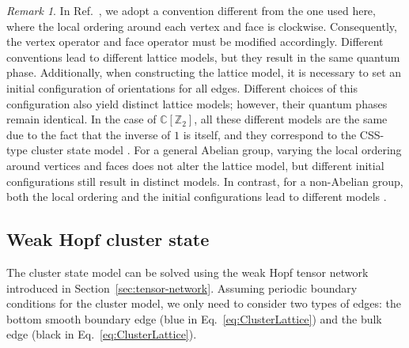 \documentclass[a4paper,11pt]{article}
\theoremstyle{theorem}
\theoremstyle{remark}
\newtheorem{remark}{Remark}[section]
\begin{document}
\begin{remark}
In Ref.~\cite{jia2024generalized}, we adopt a convention different from the one used here, where the local ordering around each vertex and face is clockwise. Consequently, the vertex operator and face operator must be modified accordingly. 
Different conventions lead to different lattice models, but they result in the same quantum phase. Additionally, when constructing the lattice model, it is necessary to set an initial configuration of orientations for all edges. Different choices of this configuration also yield distinct lattice models; however, their quantum phases remain identical.
In the case of $\mathbb{C}[\mathbb{Z}_2]$, all these different models are the same due to the fact that the inverse of $1$ is itself, and they correspond to the CSS-type cluster state model \cite{brell2015generalized}. For a general Abelian group, varying the local ordering around vertices and faces does not alter the lattice model, but different initial configurations still result in distinct models. In contrast, for a non-Abelian group, both the local ordering and the initial configurations lead to different models \cite{fechisin2023noninvertible,jia2024generalized}.
\end{remark}





\subsection{Weak Hopf cluster state}

The cluster state model can be solved using the weak Hopf tensor network introduced in Section~\ref{sec:tensor-network}. Assuming periodic boundary conditions for the cluster model, we only need to consider two types of edges: the bottom smooth boundary edge (blue in Eq.~\ref{eq:ClusterLattice}) and the bulk edge (black in Eq.~\ref{eq:ClusterLattice}).
\end{document}
